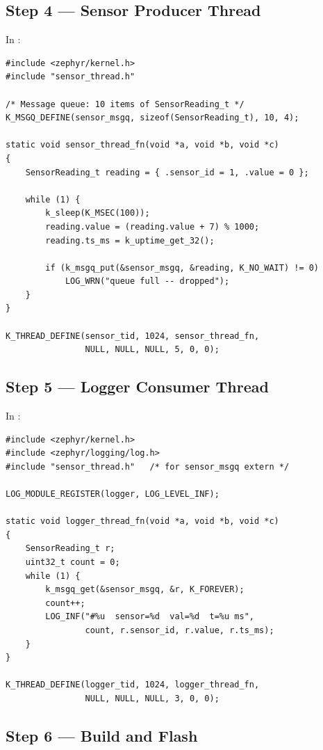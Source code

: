 \documentclass[11pt, a4paper]{article}
\begin{document}
\subsection{Step 4 --- Sensor Producer Thread}

In :

\begin{lstlisting}[style=cstyle]
#include <zephyr/kernel.h>
#include "sensor_thread.h"

/* Message queue: 10 items of SensorReading_t */
K_MSGQ_DEFINE(sensor_msgq, sizeof(SensorReading_t), 10, 4);

static void sensor_thread_fn(void *a, void *b, void *c)
{
    SensorReading_t reading = { .sensor_id = 1, .value = 0 };

    while (1) {
        k_sleep(K_MSEC(100));
        reading.value = (reading.value + 7) % 1000;
        reading.ts_ms = k_uptime_get_32();

        if (k_msgq_put(&sensor_msgq, &reading, K_NO_WAIT) != 0)
            LOG_WRN("queue full -- dropped");
    }
}

K_THREAD_DEFINE(sensor_tid, 1024, sensor_thread_fn,
                NULL, NULL, NULL, 5, 0, 0);
\end{lstlisting}

\subsection{Step 5 --- Logger Consumer Thread}

In :

\begin{lstlisting}[style=cstyle]
#include <zephyr/kernel.h>
#include <zephyr/logging/log.h>
#include "sensor_thread.h"   /* for sensor_msgq extern */

LOG_MODULE_REGISTER(logger, LOG_LEVEL_INF);

static void logger_thread_fn(void *a, void *b, void *c)
{
    SensorReading_t r;
    uint32_t count = 0;
    while (1) {
        k_msgq_get(&sensor_msgq, &r, K_FOREVER);
        count++;
        LOG_INF("#%u  sensor=%d  val=%d  t=%u ms",
                count, r.sensor_id, r.value, r.ts_ms);
    }
}

K_THREAD_DEFINE(logger_tid, 1024, logger_thread_fn,
                NULL, NULL, NULL, 3, 0, 0);
\end{lstlisting}

\subsection{Step 6 --- Build and Flash}
\end{document}
